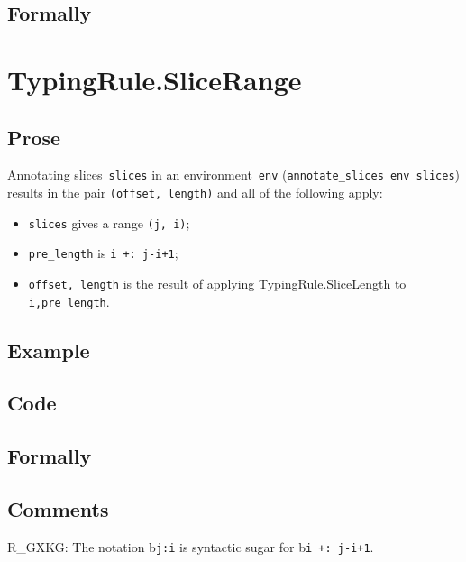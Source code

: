 \documentclass{book}
\begin{document}
\begin{emptyformal}
    \subsection{Formally}
\end{emptyformal}


\section{TypingRule.SliceRange \label{sec:TypingRule.SliceRange}}

  \subsection{Prose}
      Annotating slices~\texttt{slices} in an environment~\texttt{env}
(\texttt{annotate\_slices env slices}) results in the pair \texttt{(offset,
length)} and all of the following apply:
   \begin{itemize}
   \item \texttt{slices} gives a range \texttt{(j, i)};
   \item \texttt{pre\_length} is \texttt{i +: j-i+1};
   \item \texttt{offset, length} is the result of applying TypingRule.SliceLength to \texttt{i,pre\_length}.
   \end{itemize}

  \subsection{Example}

  \subsection{Code}

\begin{emptyformal}
    \subsection{Formally}
\end{emptyformal}

\subsection{Comments}
    R\_GXKG: The notation b\texttt{j:i} is syntactic sugar for b\texttt{i +: j-i+1}.
\end{document}

